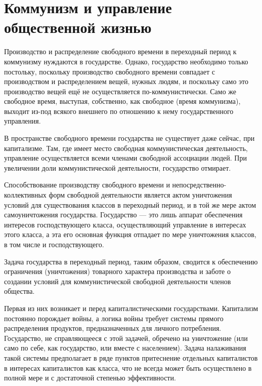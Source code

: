 \documentclass[12pt,a4paper,openany]{book}
\begin{document}
\section{Коммунизм и управление общественной жизнью}
\label{sec:07_kommunizm_upravlenie}

Производство и распределение свободного времени в переходный период к коммунизму нуждаются в государстве. Однако, государство необходимо только постольку, поскольку производство свободного времени совпадает с производством и распределением вещей, нужных людям, и поскольку само это производство вещей ещё не осуществляется по-коммунистически. Само же свободное время, выступая, собственно, как свободное (время коммунизма), выходит из-под всякого внешнего по отношению к нему государственного управления.

В пространстве свободного времени государства не существует даже сейчас, при капитализме. Там, где имеет место свободная коммунистическая деятельность, управление осуществляется всеми членами свободной ассоциации людей. При увеличении доли коммунистической деятельности, государство отмирает.

Способствование производству свободного времени и непосредственно-коллективных форм свободной деятельности является актом уничтожения условий для существования классов в переходный период, и в той же мере актом самоуничтожения государства. Государство — это лишь аппарат обеспечения интересов господствующего класса, осуществляющий управление в интересах этого класса, а эта его основная функция отпадает по мере уничтожения классов, в том числе и господствующего.

Задача государства в переходный период, таким образом, сводится к обеспечению ограничения (уничтожения) товарного характера производства и заботе о создании условий для коммунистической свободной деятельности членов общества.

Первая из них возникает и перед капиталистическими государствами. Капитализм постоянно порождает войны, а логика войны требует системы прямого распределения продуктов, предназначенных для личного потребления. Государство, не справляющееся с этой задачей, обречено на уничтожение (или само по себе, как государство, или вместе с населением). Задача налаживания такой системы предполагает в ряде пунктов притеснение отдельных капиталистов в интересах капиталистов как класса, что не всегда может быть осуществлено в полной мере и с достаточной степенью эффективности.
\end{document}
